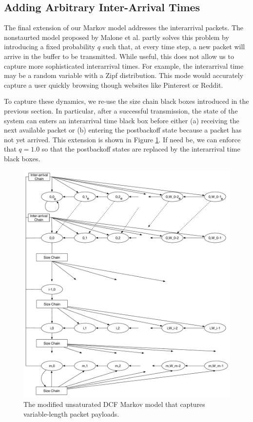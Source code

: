 \documentclass[conference]{IEEEtran}
\begin{document}
\subsection{Adding Arbitrary Inter-Arrival Times}
The final extension of our Markov model addresses the interarrival packets. The nonstaurted model proposed by Malone et al. \cite{dcf-nonsaturated} partly solves this problem by introducing a fixed probability $q$ such that, at every time step, a new packet will arrive in the buffer to be transmitted. While useful, this does not allow us to capture more sophisticated interarrival times. For example, the interarrival time may be a random variable with a Zipf distribution. This mode would accurately capture a user quickly browsing though websites like Pinterest or Reddit. 

To capture these dynamics, we re-use the size chain black boxes introduced in the previous section. In particular, after a successful transmission, the state of the system can enters an interarrival time black box before either (a) receiving the next available packet or (b) entering the postbackoff state because a packet has not yet arrived. This extension is shown in Figure \ref{fig:dcf_model_unsaturated_varpktsize_interarrival}. If need be, we can enforce that $q = 1.0$ so that the postbackoff states are replaced by the interarrival time black boxes. 

\begin{figure}
\begin{center}
\includegraphics[scale=0.25]{../../sketches/dcf_model_unsaturated_varpktsize_interarrival.pdf}
\caption{The modified unsaturated DCF Markov model that captures variable-length packet payloads.}
\label{fig:dcf_model_unsaturated_varpktsize_interarrival}
\end{center}
\end{figure}
\end{document}
